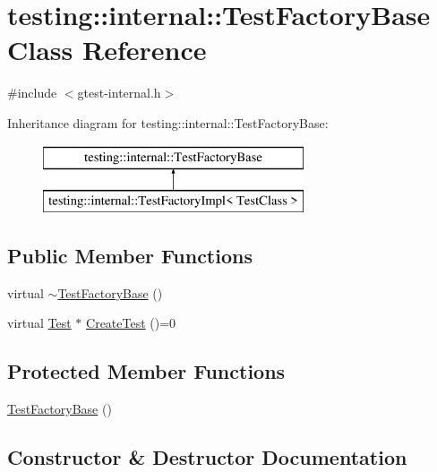 \hypertarget{classtesting_1_1internal_1_1_test_factory_base}{}\section{testing\+:\+:internal\+:\+:Test\+Factory\+Base Class Reference}
\label{classtesting_1_1internal_1_1_test_factory_base}


{\ttfamily \#include $<$gtest-\/internal.\+h$>$}

Inheritance diagram for testing\+:\+:internal\+:\+:Test\+Factory\+Base\+:\begin{figure}[H]
\begin{center}
\leavevmode
\includegraphics[height=2.000000cm]{classtesting_1_1internal_1_1_test_factory_base}
\end{center}
\end{figure}
\subsection*{Public Member Functions}
\begin{DoxyCompactItemize}
\item 
virtual \hyperlink{classtesting_1_1internal_1_1_test_factory_base_a18f22a7594336a36642289c1decddc9e}{$\sim$\+Test\+Factory\+Base} ()
\item 
virtual \hyperlink{classtesting_1_1_test}{Test} $\ast$ \hyperlink{classtesting_1_1internal_1_1_test_factory_base_a07ac3ca0b196cdb092da0bb186b7c030}{Create\+Test} ()=0
\end{DoxyCompactItemize}
\subsection*{Protected Member Functions}
\begin{DoxyCompactItemize}
\item 
\hyperlink{classtesting_1_1internal_1_1_test_factory_base_afedbf147b2a213517b315880d8c81427}{Test\+Factory\+Base} ()
\end{DoxyCompactItemize}


\subsection{Constructor \& Destructor Documentation}
\hypertarget{classtesting_1_1internal_1_1_test_factory_base_a18f22a7594336a36642289c1decddc9e}{}
